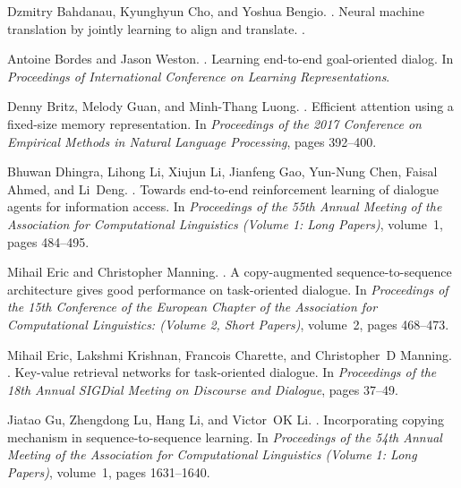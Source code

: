 \documentclass[11pt]{article}
\begin{document}
\begin{thebibliography}{}
	
	Dzmitry Bahdanau, Kyunghyun Cho, and Yoshua Bengio.
	.
	\newblock Neural machine translation by jointly learning to align and
	translate.
	.
	
	Antoine Bordes and Jason Weston.
	.
	\newblock Learning end-to-end goal-oriented dialog.
	\newblock In {\em Proceedings of International Conference on Learning
		Representations}.
	
	Denny Britz, Melody Guan, and Minh-Thang Luong.
	.
	\newblock Efficient attention using a fixed-size memory representation.
	\newblock In {\em Proceedings of the 2017 Conference on Empirical Methods in
		Natural Language Processing}, pages 392--400.
	
	Bhuwan Dhingra, Lihong Li, Xiujun Li, Jianfeng Gao, Yun-Nung Chen, Faisal
	Ahmed, and Li~Deng.
	.
	\newblock Towards end-to-end reinforcement learning of dialogue agents for
	information access.
	\newblock In {\em Proceedings of the 55th Annual Meeting of the Association for
		Computational Linguistics (Volume 1: Long Papers)}, volume~1, pages 484--495.
	
	Mihail Eric and Christopher Manning.
	.
	\newblock A copy-augmented sequence-to-sequence architecture gives good
	performance on task-oriented dialogue.
	\newblock In {\em Proceedings of the 15th Conference of the European Chapter of
		the Association for Computational Linguistics: (Volume 2, Short Papers)},
	volume~2, pages 468--473.
	
	Mihail Eric, Lakshmi Krishnan, Francois Charette, and Christopher~D Manning.
	.
	\newblock Key-value retrieval networks for task-oriented dialogue.
	\newblock In {\em Proceedings of the 18th Annual SIGDial Meeting on Discourse
		and Dialogue}, pages 37--49.
	
	Jiatao Gu, Zhengdong Lu, Hang Li, and Victor~OK Li.
	.
	\newblock Incorporating copying mechanism in sequence-to-sequence learning.
	\newblock In {\em Proceedings of the 54th Annual Meeting of the Association for
		Computational Linguistics (Volume 1: Long Papers)}, volume~1, pages
	1631--1640.
	

\end{thebibliography}
\end{document}
